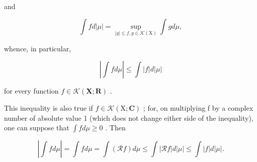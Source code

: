 and

\[
\int f d | \mu | = \sup _ {| g | \leqslant f, g \in \mathcal {K} (\mathrm{X})} \int g d \mu ,\tag{9}
\]

whence, in particular,

\[
\left| \int f d \mu \right| \leqslant \int | f | d | \mu |\tag{10}
\]

for every function \(f \in \mathcal{K}(\mathbf{X};\mathbf{R})\) .

This inequality is also true if \(f \in \mathcal{K}(\mathrm{X};\mathbf{C})\) ; for, on multiplying f by a complex number of absolute value 1 (which does not change either side of the inequality), one can suppose that \(\int f d\mu \geqslant 0\) . Then

\[
\left| \int f d \mu \right| = \int f d \mu = \int (\mathcal {R} f) d \mu \leqslant \int | \mathcal {R} f | d | \mu | \leqslant \int | f | d | \mu |.
\]

